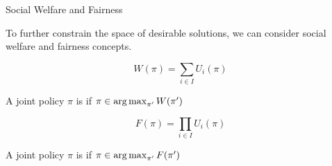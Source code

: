 \begin{frame}{Social Welfare and Fairness}

To further constrain the space of desirable solutions, we can consider social welfare and fairness concepts. 

\vspace{1pt}
\begin{equation*}
    W(\pi) = \sum_{i \in I}U_i(\pi)
\end{equation*}

\blist
    \item A joint policy \(\pi\) is  if \(\pi \in \operatorname*{arg\,max}_{\pi'}W(\pi')\)
\elist

\vspace{1pt}
\begin{equation*}
    F(\pi) = \prod_{i \in I} U_i (\pi)
\end{equation*}

\blist
    \item A joint policy $\pi$ is  if $\pi \in \operatorname*{arg\,max}_{\pi'}F(\pi')$
\elist

\end{frame}

